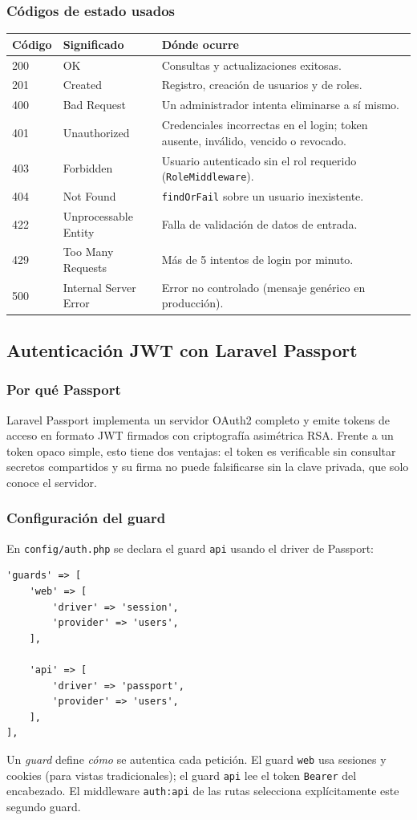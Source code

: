 \subsubsection{Códigos de estado usados}
\begin{longtable}{p{1.5cm}p{4.5cm}p{9cm}}
\toprule
\textbf{Código} & \textbf{Significado} & \textbf{Dónde ocurre} \\
\midrule
\endhead
200 & OK & Consultas y actualizaciones exitosas. \\
201 & Created & Registro, creación de usuarios y de roles. \\
400 & Bad Request & Un administrador intenta eliminarse a sí mismo. \\
401 & Unauthorized & Credenciales incorrectas en el login; token ausente, inválido, vencido o revocado. \\
403 & Forbidden & Usuario autenticado sin el rol requerido (\texttt{RoleMiddleware}). \\
404 & Not Found & \texttt{findOrFail} sobre un usuario inexistente. \\
422 & Unprocessable Entity & Falla de validación de datos de entrada. \\
429 & Too Many Requests & Más de 5 intentos de login por minuto. \\
500 & Internal Server Error & Error no controlado (mensaje genérico en producción). \\
\bottomrule
\end{longtable}

\subsection{Autenticación JWT con Laravel Passport}

\subsubsection{Por qué Passport}
Laravel Passport implementa un servidor OAuth2 completo y emite tokens de acceso en formato JWT firmados con criptografía asimétrica RSA. Frente a un token opaco simple, esto tiene dos ventajas: el token es verificable sin consultar secretos compartidos y su firma no puede falsificarse sin la clave privada, que solo conoce el servidor.

\subsubsection{Configuración del guard}
En \texttt{config/auth.php} se declara el guard \texttt{api} usando el driver de Passport:
\begin{lstlisting}[caption={config/auth.php (fragmento)}]
'guards' => [
    'web' => [
        'driver' => 'session',
        'provider' => 'users',
    ],

    'api' => [
        'driver' => 'passport',
        'provider' => 'users',
    ],
],
\end{lstlisting}
Un \emph{guard} define \emph{cómo} se autentica cada petición. El guard \texttt{web} usa sesiones y cookies (para vistas tradicionales); el guard \texttt{api} lee el token \texttt{Bearer} del encabezado. El middleware \texttt{auth:api} de las rutas selecciona explícitamente este segundo guard.

